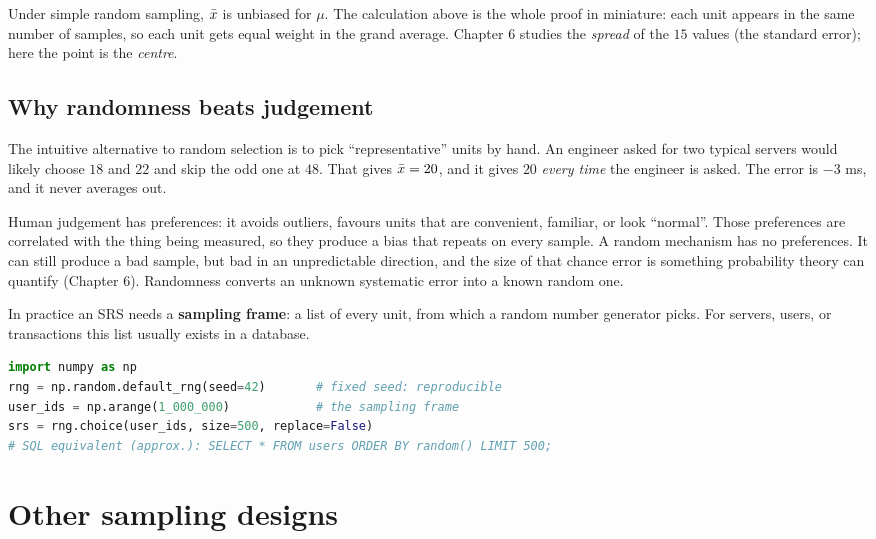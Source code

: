 Under simple random sampling, $\bar{x}$ is unbiased for $\mu$. The calculation above is
the whole proof in miniature: each unit appears in the same number of samples, so each
unit gets equal weight in the grand average. Chapter 6 studies the \emph{spread} of the
$15$ values (the standard error); here the point is the \emph{centre}.

\subsection{Why randomness beats judgement}

The intuitive alternative to random selection is to pick ``representative'' units by
hand. An engineer asked for two typical servers would likely choose $18$ and $22$ and
skip the odd one at $48$. That gives $\bar{x} = 20$, and it gives $20$ \emph{every time}
the engineer is asked. The error is $-3$ ms, and it never averages out.

\begin{whybox}
Human judgement has preferences: it avoids outliers, favours units that are convenient,
familiar, or look ``normal''. Those preferences are correlated with the thing being
measured, so they produce a bias that repeats on every sample. A random mechanism has no
preferences. It can still produce a bad sample, but bad in an unpredictable direction,
and the size of that chance error is something probability theory can quantify
(Chapter 6). Randomness converts an unknown systematic error into a known random one.
\end{whybox}

In practice an SRS needs a \textbf{sampling frame}: a list of every unit, from which a
random number generator picks. For servers, users, or transactions this list usually
exists in a database.

\begin{lstlisting}[language=Python]
import numpy as np
rng = np.random.default_rng(seed=42)       # fixed seed: reproducible
user_ids = np.arange(1_000_000)            # the sampling frame
srs = rng.choice(user_ids, size=500, replace=False)
# SQL equivalent (approx.): SELECT * FROM users ORDER BY random() LIMIT 500;
\end{lstlisting}

\section{Other sampling designs}
\label{sec:sampling-designs}

